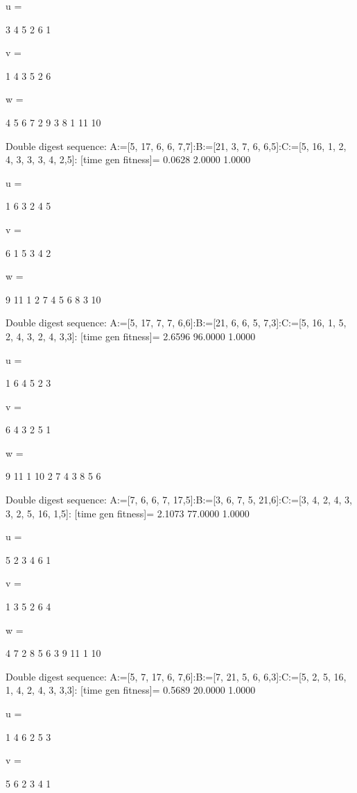 u =

     3     4     5     2     6     1


v =

     1     4     3     5     2     6


w =

     4     5     6     7     2     9     3     8     1    11    10

Double digest sequence:
A:=[5, 17, 6, 6, 7,7]:B:=[21, 3, 7, 6, 6,5]:C:=[5, 16, 1, 2, 4, 3, 3, 3, 4, 2,5]:
[time gen fitness]=
    0.0628    2.0000    1.0000


u =

     1     6     3     2     4     5


v =

     6     1     5     3     4     2


w =

     9    11     1     2     7     4     5     6     8     3    10

Double digest sequence:
A:=[5, 17, 7, 7, 6,6]:B:=[21, 6, 6, 5, 7,3]:C:=[5, 16, 1, 5, 2, 4, 3, 2, 4, 3,3]:
[time gen fitness]=
    2.6596   96.0000    1.0000


u =

     1     6     4     5     2     3


v =

     6     4     3     2     5     1


w =

     9    11     1    10     2     7     4     3     8     5     6

Double digest sequence:
A:=[7, 6, 6, 7, 17,5]:B:=[3, 6, 7, 5, 21,6]:C:=[3, 4, 2, 4, 3, 3, 2, 5, 16, 1,5]:
[time gen fitness]=
    2.1073   77.0000    1.0000


u =

     5     2     3     4     6     1


v =

     1     3     5     2     6     4


w =

     4     7     2     8     5     6     3     9    11     1    10

Double digest sequence:
A:=[5, 7, 17, 6, 7,6]:B:=[7, 21, 5, 6, 6,3]:C:=[5, 2, 5, 16, 1, 4, 2, 4, 3, 3,3]:
[time gen fitness]=
    0.5689   20.0000    1.0000


u =

     1     4     6     2     5     3


v =

     5     6     2     3     4     1



